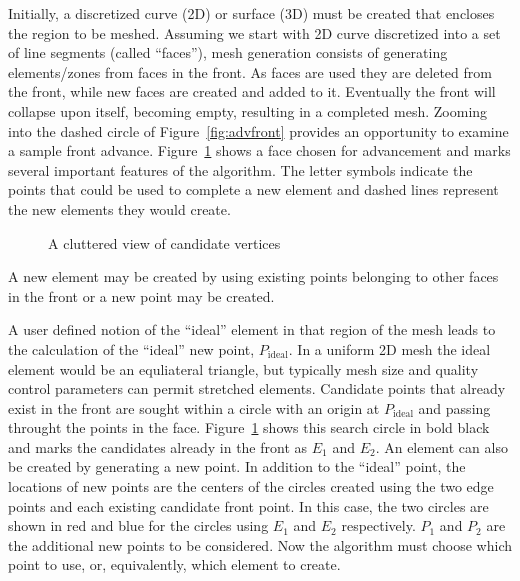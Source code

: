 \documentclass{article}
\begin{document}
Initially, a discretized
curve (2D) or surface (3D) must be created that encloses the region to be meshed.  
Assuming we start with 2D curve discretized into a set of line segments (called
``faces''), mesh generation consists of generating elements/zones from faces in the 
front.  As faces are used they are deleted from the front, while new faces are created
and added to it.  Eventually the front will collapse upon itself, becoming empty, 
resulting in a completed mesh.
Zooming into the dashed circle of Figure~\ref{fig:advfront} provides an
opportunity to examine a sample front advance.  Figure~\ref{fig:advfront-cand} shows
a face chosen for advancement and marks several important features of the algorithm.
The letter symbols indicate the points that could be used to complete a new element and
dashed lines represent the new elements they would create.
\begin{figure}
 \begin{center}
 \caption{A cluttered view of candidate vertices}\label{fig:advfront-cand}
 \end{center}
\end{figure} 
A new element may be created by using existing points belonging to other
faces in the front or a new point may be created.  

A user defined notion of
the ``ideal'' element in that region of the mesh leads to the calculation of
the ``ideal'' new point, $P_{\mbox{ideal}}$.  In a uniform 2D mesh the ideal element would be an
equliateral triangle, but typically mesh size and quality control
parameters can permit stretched elements.  Candidate points that already exist in
the front are sought within a circle with an origin at $P_{\mbox{ideal}}$ and passing throught the 
points in the face. Figure~\ref{fig:advfront-cand} shows this search circle 
in bold black and marks the candidates already in the front as $E_{1}$ and $E_{2}$.  
An element can also be created by generating a new point.  In addition to the ``ideal''
point, the locations of new points are the centers of the circles created using the two edge 
points and each existing candidate front point.  In this case, the two circles
are shown in red and blue for the circles using $E_{1}$ and $E_{2}$ respectively. $P_{1}$
and $P_{2}$ are the additional new points to be considered.  Now the algorithm must choose 
which point to use, or, equivalently, which element to create.
\end{document}
